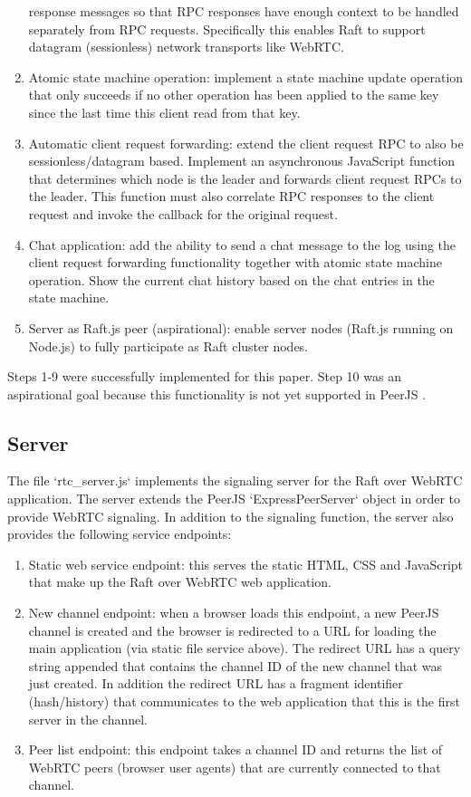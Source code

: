 \documentclass[9pt]{extarticle}
\begin{document}
\begin{multicols}{2}
\begin{enumerate}
    response messages so that RPC responses have enough context to be
    handled separately from RPC requests. Specifically this enables
    Raft to support datagram (sessionless) network transports like
    WebRTC.
\item Atomic state machine operation: implement a state machine
    update operation that only succeeds if no other operation has been
    applied to the same key since the last time this client read from
    that key.
\item Automatic client request forwarding: extend the client request
    RPC to also be sessionless/datagram based. Implement an
    asynchronous JavaScript function that determines which node is the
    leader and forwards client request RPCs to the leader. This
    function must also correlate RPC responses to the client request
    and invoke the callback for the original request.
\item Chat application: add the ability to send a chat message to the
    log using the client request forwarding functionality together
    with atomic state machine operation. Show the current chat history
    based on the chat entries in the state machine.
\item Server as Raft.js peer (aspirational): enable server nodes
    (Raft.js running on Node.js) to fully participate as Raft cluster
    nodes.
\end{enumerate}

Steps 1-9 were successfully implemented for this paper. Step 10 was an
aspirational goal because this functionality is not yet supported in
PeerJS \cite{peerjs:103}.

\subsection{Server}

The file `rtc\_server.js` implements the signaling server for the Raft
over WebRTC application. The server extends the PeerJS
`ExpressPeerServer` object in order to provide WebRTC signaling. In
addition to the signaling function, the server also provides the
following service endpoints:

\begin{enumerate}
\item Static web service endpoint: this serves the static HTML, CSS
    and JavaScript that make up the Raft over WebRTC web application.
\item New channel endpoint: when a browser loads this endpoint, a new
    PeerJS channel is created and the browser is redirected to a URL
    for loading the main application (via static file service above).
    The redirect URL has a query string appended that contains the
    channel ID of the new channel that was just created. In addition
    the redirect URL has a fragment identifier (hash/history) that
    communicates to the web application that this is the first server
    in the channel.
\item Peer list endpoint: this endpoint takes a channel ID and returns
    the list of WebRTC peers (browser user agents) that are currently
    connected to that channel.


\end{enumerate}
\end{multicols}
\end{document}
